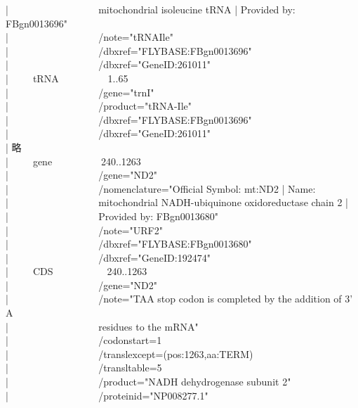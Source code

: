 \documentclass[titlepage,10pt,a4paper]{jsbook}
\newenvironment{content}{\begin{shaded}\vspace{-1em}\raggedright\ttfamily\footnotesize\setlength{\baselineskip}{1.4em}}{\end{shaded}\vspace{-1em}}
\begin{document}
\begin{content}
| ~ ~ ~ ~ ~ ~ ~ ~ ~ ~ ~mitochondrial isoleucine tRNA | Provided by: FBgn0013696"\\
| ~ ~ ~ ~ ~ ~ ~ ~ ~ ~ ~/note="tRNA{\lbrack}Ile{\rbrack}"\\
| ~ ~ ~ ~ ~ ~ ~ ~ ~ ~ ~/db{\textunderscore}xref="FLYBASE:FBgn0013696"\\
| ~ ~ ~ ~ ~ ~ ~ ~ ~ ~ ~/db{\textunderscore}xref="GeneID:261011"\\
| ~ ~ ~tRNA~ ~ ~ ~ ~ ~ 1..65\\
| ~ ~ ~ ~ ~ ~ ~ ~ ~ ~ ~/gene="trnI"\\
| ~ ~ ~ ~ ~ ~ ~ ~ ~ ~ ~/product="tRNA-Ile"\\
| ~ ~ ~ ~ ~ ~ ~ ~ ~ ~ ~/db{\textunderscore}xref="FLYBASE:FBgn0013696"\\
| ~ ~ ~ ~ ~ ~ ~ ~ ~ ~ ~/db{\textunderscore}xref="GeneID:261011"\\
| 略\\
| ~ ~ ~gene~ ~ ~ ~ ~ ~ 240..1263\\
| ~ ~ ~ ~ ~ ~ ~ ~ ~ ~ ~/gene="ND2"\\
| ~ ~ ~ ~ ~ ~ ~ ~ ~ ~ ~/nomenclature="Official Symbol: mt:ND2 | Name:\\
| ~ ~ ~ ~ ~ ~ ~ ~ ~ ~ ~mitochondrial NADH-ubiquinone oxidoreductase chain 2 |\\
| ~ ~ ~ ~ ~ ~ ~ ~ ~ ~ ~Provided by: FBgn0013680"\\
| ~ ~ ~ ~ ~ ~ ~ ~ ~ ~ ~/note="URF2"\\
| ~ ~ ~ ~ ~ ~ ~ ~ ~ ~ ~/db{\textunderscore}xref="FLYBASE:FBgn0013680"\\
| ~ ~ ~ ~ ~ ~ ~ ~ ~ ~ ~/db{\textunderscore}xref="GeneID:192474"\\
| ~ ~ ~CDS~ ~ ~ ~ ~ ~ ~240..1263\\
| ~ ~ ~ ~ ~ ~ ~ ~ ~ ~ ~/gene="ND2"\\
| ~ ~ ~ ~ ~ ~ ~ ~ ~ ~ ~/note="TAA stop codon is completed by the addition of 3' A\\
| ~ ~ ~ ~ ~ ~ ~ ~ ~ ~ ~residues to the mRNA"\\
| ~ ~ ~ ~ ~ ~ ~ ~ ~ ~ ~/codon{\textunderscore}start=1\\
| ~ ~ ~ ~ ~ ~ ~ ~ ~ ~ ~/transl{\textunderscore}except=(pos:1263,aa:TERM)\\
| ~ ~ ~ ~ ~ ~ ~ ~ ~ ~ ~/transl{\textunderscore}table=5\\
| ~ ~ ~ ~ ~ ~ ~ ~ ~ ~ ~/product="NADH dehydrogenase subunit 2"\\
| ~ ~ ~ ~ ~ ~ ~ ~ ~ ~ ~/protein{\textunderscore}id="NP{\textunderscore}008277.1"\\

\end{content}
\end{document}
